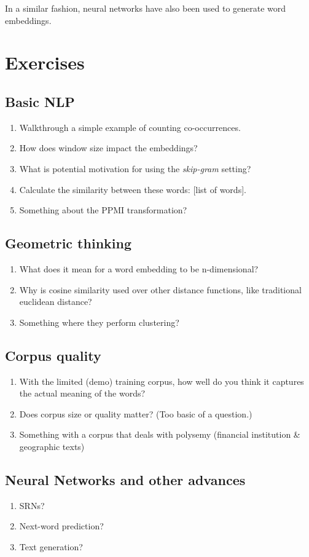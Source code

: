 In a similar fashion, neural networks have also been used to generate word embeddings.





\section{Exercises}

\subsection{Basic NLP}

\begin{enumerate}
\item Walkthrough a simple example of counting co-occurrences.
\item How does window size impact the embeddings?
\item What is potential motivation for using the \textit{skip-gram} setting?
\item Calculate the similarity between these words: [list of words]. 
\item Something about the PPMI transformation?
\end{enumerate}

\subsection{Geometric thinking}

\begin{enumerate}
\item What does it mean for a word embedding to be n-dimensional?
\item Why is cosine similarity used over other distance functions, like traditional euclidean distance?
\item Something where they perform clustering?
\end{enumerate}

\subsection{Corpus quality}

\begin{enumerate}
\item With the limited (demo) training corpus, how well do you think it captures the actual meaning of the words?
\item Does corpus size or quality matter? (Too basic of a question.)
\item Something with a corpus that deals with polysemy (financial institution \& geographic texts)
\end{enumerate}

\subsection{Neural Networks and other advances}

\begin{enumerate}
\item SRNs?
\item Next-word prediction?
\item Text generation?
\end{enumerate}